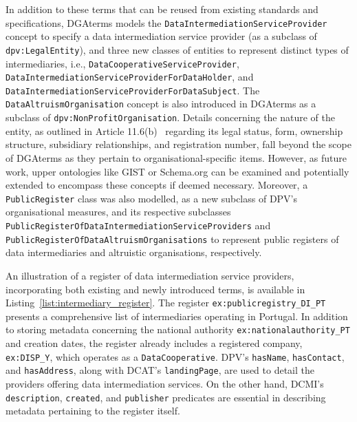 In addition to these terms that can be reused from existing standards and specifications, DGAterms models the \texttt{DataIntermediationServiceProvider} concept to specify a data intermediation service provider (as a subclass of \texttt{dpv:LegalEntity}), and three new classes of entities to represent distinct types of intermediaries, i.e., \texttt{DataCooperativeServiceProvider}, \texttt{DataIntermediationServiceProviderForDataHolder}, and \texttt{DataIntermediationServiceProviderForDataSubject}.
The \texttt{DataAltruismOrganisation} concept is also introduced in DGAterms as a subclass of \texttt{dpv:NonProfitOrganisation}.
Details concerning the nature of the entity, as outlined in Article 11.6(b)~\citeyearpar{noauthor_regulation_2022} regarding its legal status, form, ownership structure, subsidiary relationships, and registration number, fall beyond the scope of DGAterms as they pertain to organisational-specific items.
However, as future work, upper ontologies like GIST \citeyearpar{semantic_arts_gist} or Schema.org \citep{guha_schemaorg_2015} can be examined and potentially extended to encompass these concepts if deemed necessary.
Moreover, a \texttt{PublicRegister} class was also modelled, as a new subclass of DPV's organisational measures, and its respective subclasses \texttt{PublicRegisterOfDataIntermediationServiceProviders} and \texttt{PublicRegisterOfDataAltruismOrganisations} to represent public registers of data intermediaries and altruistic organisations, respectively.

An illustration of a register of data intermediation service providers, incorporating both existing and newly introduced terms, is available in Listing~\ref{list:intermediary_register}.
The register \texttt{ex:publicregistry\_DI\_PT} presents a comprehensive list of intermediaries operating in Portugal.
In addition to storing metadata concerning the national authority \texttt{ex:nationalauthority\_PT} and creation dates, the register already includes a registered company, \texttt{ex:DISP\_Y}, which operates as a \texttt{DataCooperative}.
DPV's \texttt{hasName}, \texttt{hasContact}, and \texttt{hasAddress}, along with DCAT's \texttt{landingPage}, are used to detail the providers offering data intermediation services.
On the other hand, DCMI's \texttt{description}, \texttt{created}, and \texttt{publisher} predicates are essential in describing metadata pertaining to the register itself.

